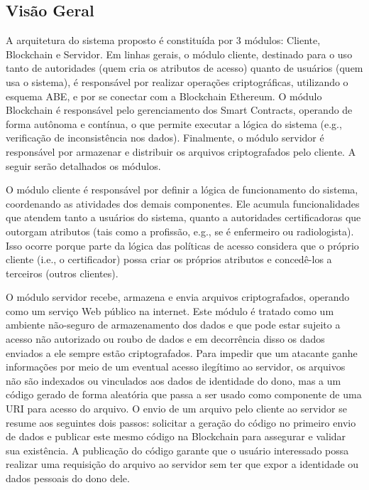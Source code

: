 \documentclass[a4paper,11pt]{article}
\begin{document}
\subsection{Visão Geral}
\label{sec:sub:visaogeral}


A arquitetura do sistema proposto é constituída por 3 módulos: Cliente, Blockchain e Servidor.  Em linhas gerais, o módulo cliente, %
destinado para o uso tanto de autoridades (quem cria os atributos de acesso) quanto de usuários (quem usa o sistema), é responsável por %
realizar operações criptográficas, utilizando o esquema ABE, e por se conectar com a Blockchain Ethereum.
O módulo Blockchain é responsável pelo gerenciamento dos Smart Contracts, operando de forma autônoma e contínua, o que permite executar a lógica do sistema (e.g., verificação de inconsistência nos dados).
Finalmente, o módulo servidor é responsável por armazenar e distribuir os arquivos criptografados pelo cliente.
A seguir serão detalhados os módulos.


O módulo cliente é responsável por definir a lógica de funcionamento do sistema, coordenando as atividades dos demais componentes.
Ele acumula funcionalidades que atendem tanto a usuários do sistema, quanto a autoridades certificadoras que outorgam atributos (tais como a profissão, e.g., se é enfermeiro ou radiologista).
Isso ocorre porque parte da lógica das políticas de acesso considera que o próprio cliente (i.e., o certificador) possa criar os próprios atributos e concedê-los a terceiros (outros clientes).

O módulo servidor recebe, armazena e envia arquivos criptografados, operando como um serviço Web público na internet.
Este módulo é tratado como um ambiente não-seguro de armazenamento dos dados e que pode estar sujeito a acesso não autorizado ou roubo de dados e em decorrência disso os dados enviados a ele sempre estão criptografados.
Para impedir que um atacante ganhe informações por meio de um eventual acesso ilegítimo ao servidor, os arquivos não são indexados ou vinculados aos dados de identidade do dono, mas a um código gerado de forma aleatória que passa a ser usado como componente de uma URI para acesso do arquivo.
O envio de um arquivo pelo cliente ao servidor se resume aos seguintes dois passos:
solicitar a geração do código no primeiro envio de dados e publicar este mesmo código na Blockchain para assegurar e validar sua existência.
A publicação do código garante que o usuário interessado possa realizar uma requisição do arquivo ao servidor sem ter que expor a identidade ou dados pessoais do dono dele.
\end{document}
